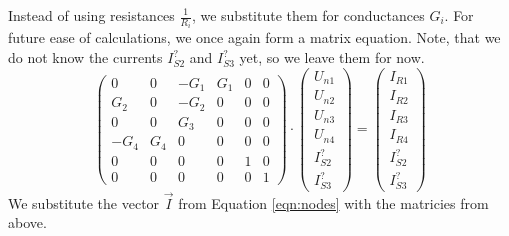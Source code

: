 \documentclass[a4paper]{article}
\begin{document}
{Instead of using resistances $\frac{1}{R_i}$,  we substitute them for conductances
$G_{i}$. For future ease of calculations, we once again form a matrix equation. Note, that we do not know
the currents $I_{S2}^?$ and $I_{S3}^?$ yet, so we leave them for now.
\begin{equation}
   \begin{pmatrix}
      0 & 0 & -G_1 & G_1 & 0 & 0 \\
      G_2 & 0 & -G_2 & 0 & 0 & 0 \\
      0 & 0 & G_3 & 0 & 0 & 0 \\
      -G_4 & G_4 & 0 & 0 & 0 & 0\\
      0 & 0 & 0 & 0 & 1 & 0 \\
      0 & 0 & 0 & 0 & 0 & 1 
   \end{pmatrix}
   \cdot
   \begin{pmatrix}
      U_{n1} \\ U_{n2} \\ U_{n3} \\ U_{n4} \\ I_{S2}^? \\ I_{S3}^?
   \end{pmatrix}
   =
   \begin{pmatrix}
       I_{R1} \\ I_{R2} \\ I_{R3} \\ I_{R4} \\ I_{S2}^? \\ I_{S3}^? 
   \end{pmatrix}
   \label{eqn:currents}
\end{equation}
We substitute the vector $\vec{I}$ from Equation \ref{eqn:nodes} with the matricies from above. 

}
\end{document}
